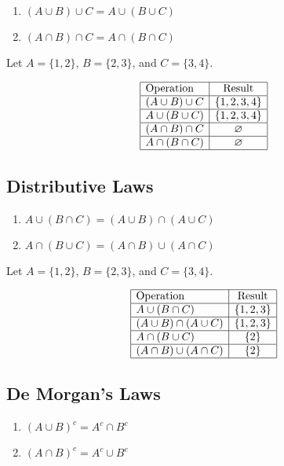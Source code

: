\documentclass[12pt,a4paper,openany]{article}
\begin{document}
\begin{enumerate}
    \item $(A \cup B) \cup C = A \cup (B \cup C)$
    \item $(A \cap B) \cap C = A \cap (B \cap C)$
\end{enumerate}

Let $A = \{1, 2\}$, $B = \{2, 3\}$, and $C = \{3, 4\}$.

\[
\begin{array}{|l|c|}
\hline
\text{Operation} & \text{Result} \\ \hline
(A \cup B) \cup C & \{1, 2, 3, 4\} \\ \hline
A \cup (B \cup C) & \{1, 2, 3, 4\} \\ \hline
(A \cap B) \cap C & \varnothing \\ \hline
A \cap (B \cap C) & \varnothing \\ \hline
\end{array}
\]


\subsection{Distributive Laws}

\begin{enumerate}
    \item $A \cup (B \cap C) = (A \cup B) \cap (A \cup C)$
    \item $A \cap (B \cup C) = (A \cap B) \cup (A \cap C)$
\end{enumerate}

Let $A = \{1, 2\}$, $B = \{2, 3\}$, and $C = \{3, 4\}$.

\[
\begin{array}{|l|c|}
\hline
\text{Operation} & \text{Result} \\ \hline
A \cup (B \cap C) & \{1, 2, 3\} \\ \hline
(A \cup B) \cap (A \cup C) & \{1, 2, 3\} \\ \hline
A \cap (B \cup C) & \{2\} \\ \hline
(A \cap B) \cup (A \cap C) & \{2\} \\ \hline
\end{array}
\]


\subsection{De Morgan's Laws}

\begin{enumerate}
    \item $(A \cup B)^c = A^c \cap B^c$
    \item $(A \cap B)^c = A^c \cup B^c$
\end{enumerate}
\end{document}
